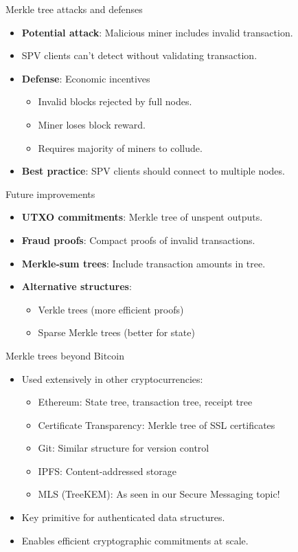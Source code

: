 \documentclass[aspectratio=169, lualatex, handout]{beamer}
\begin{document}
\begin{frame}{Merkle tree attacks and defenses}
	\begin{itemize}
		\item \textbf{Potential attack}: Malicious miner includes invalid transaction.
		\item SPV clients can't detect without validating transaction.
		\item \textbf{Defense}: Economic incentives
		      \begin{itemize}
			      \item Invalid blocks rejected by full nodes.
			      \item Miner loses block reward.
			      \item Requires majority of miners to collude.
		      \end{itemize}
		\item \textbf{Best practice}: SPV clients should connect to multiple nodes.
	\end{itemize}
\end{frame}

\begin{frame}{Future improvements}
	\begin{itemize}
		\item \textbf{UTXO commitments}: Merkle tree of unspent outputs.
		\item \textbf{Fraud proofs}: Compact proofs of invalid transactions.
		\item \textbf{Merkle-sum trees}: Include transaction amounts in tree.
		\item \textbf{Alternative structures}:
		      \begin{itemize}
			      \item Verkle trees (more efficient proofs)
			      \item Sparse Merkle trees (better for state)
		      \end{itemize}
	\end{itemize}
\end{frame}

\begin{frame}{Merkle trees beyond Bitcoin}
	\begin{itemize}
		\item Used extensively in other cryptocurrencies:
		      \begin{itemize}
			      \item Ethereum: State tree, transaction tree, receipt tree
			      \item Certificate Transparency: Merkle tree of SSL certificates
			      \item Git: Similar structure for version control
			      \item IPFS: Content-addressed storage
			      \item MLS (TreeKEM): As seen in our Secure Messaging topic!
		      \end{itemize}
		\item Key primitive for authenticated data structures.
		\item Enables efficient cryptographic commitments at scale.
	\end{itemize}
\end{frame}
\end{document}
